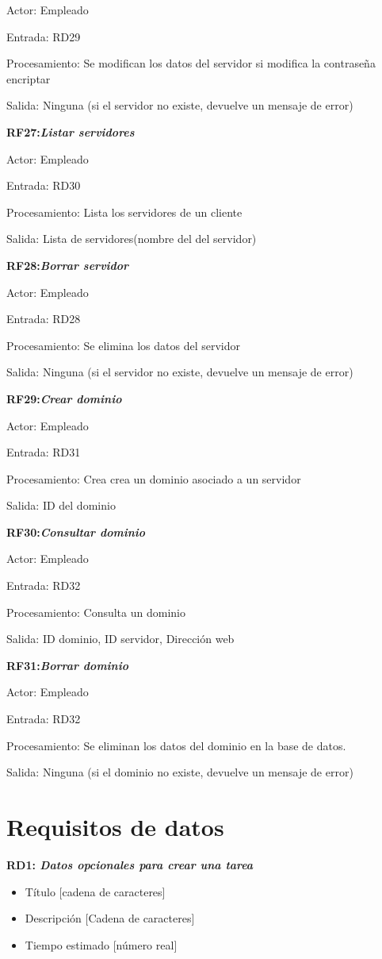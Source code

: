 \documentclass[paper=a4, fontsize=11pt, spanish]{scrartcl}
\begin{document}
Actor: Empleado

Entrada: RD29

Procesamiento: Se modifican los datos del servidor si modifica la contraseña encriptar

Salida: Ninguna (si el servidor no existe, devuelve un mensaje de error)

\setlength{\parindent}{0em}
\textbf{RF27:\textit{Listar servidores}}
\setlength{\parindent}{3em}

Actor: Empleado

Entrada: RD30

Procesamiento: Lista los servidores de un cliente

Salida: Lista de servidores(nombre del del servidor)

\setlength{\parindent}{0em}
\textbf{RF28:\textit{Borrar servidor}}
\setlength{\parindent}{3em}

Actor: Empleado

Entrada: RD28

Procesamiento: Se elimina los datos del servidor

Salida: Ninguna  (si el servidor no existe, devuelve un mensaje de error)

\setlength{\parindent}{0em}
\textbf{RF29:\textit{Crear dominio}}
\setlength{\parindent}{3em}

Actor: Empleado

Entrada: RD31

Procesamiento: Crea crea un dominio asociado a un servidor

Salida: ID del dominio

\setlength{\parindent}{0em}
\textbf{RF30:\textit{Consultar dominio}}
\setlength{\parindent}{3em}

Actor: Empleado

Entrada: RD32

Procesamiento: Consulta un dominio

Salida: ID dominio, ID servidor, Dirección web

\setlength{\parindent}{0em}
\textbf{RF31:\textit{Borrar dominio}}
\setlength{\parindent}{3em}

Actor: Empleado

Entrada: RD32

Procesamiento: Se eliminan los datos del dominio en la base de datos.

Salida: Ninguna  (si el dominio no existe, devuelve un mensaje de error)

\section{Requisitos de datos}
\setlength{\parindent}{0em}
\textbf{RD1: \textit{Datos opcionales para crear una tarea}}
\setlength{\parindent}{2em}
\begin{itemize}
\item Título [cadena de caracteres]
\item Descripción [Cadena de caracteres]
\item Tiempo estimado [número real]
\end{itemize}
\end{document}
